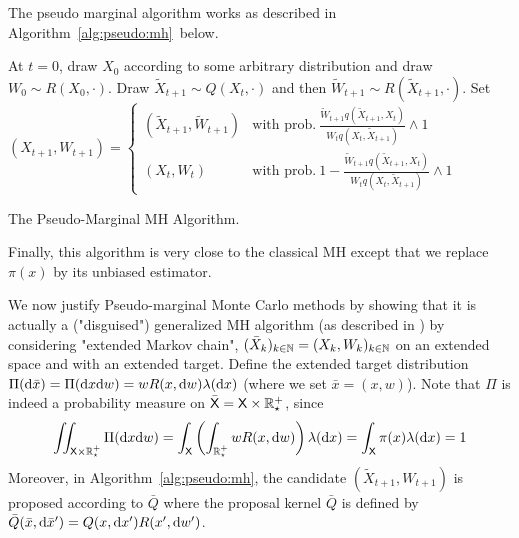 \documentclass[english,graybox,envcountchap,envcountsame,sectrefs,shortlabels]{svmono}
\theoremstyle{style}
\begin{document}
The pseudo marginal algorithm works as described in Algorithm~\ref{alg:pseudo:mh}\ below.
\begin{algorithm}
\centering
\begin{algorithmic}
\State At $t=0$, draw $X_{0}$ according to some arbitrary distribution and draw $W_0\sim R(X_0,\cdot)$.
\State Draw $\tilde X_{t+1}\sim Q(X_{t},\cdot)$ and then $ \tilde W_{t+1}\sim R(\tilde X_{t+1},\cdot)$.
\State Set $(X_{t+1},W_{t+1})=\begin{cases} (\tilde X_{t+1},\tilde W_{t+1}) & \mbox{with prob.}\ \frac{\tilde W_{t+1} q(\tilde X_{t+1},X_t)}{W_t q(X_t,\tilde X_{t+1})}\wedge 1\\ (X_{t},W_t)& \mbox{with prob.}\ 1-\frac{\tilde W_{t+1} q(\tilde X_{t+1},X_t)}{W_t q(X_t,\tilde X_{t+1})}\wedge 1\end{cases}$
\EndFor
\end{algorithmic}
\label{alg:pseudo:mh}
\caption{The Pseudo-Marginal MH Algorithm.}
\end{algorithm}
%
Finally, this algorithm is very close to the classical MH except that we replace $\pi(x)$ by its unbiased estimator.



We now justify Pseudo-marginal Monte Carlo methods by showing that it is actually a ("disguised") generalized MH algorithm (as described in ) by considering "extended Markov chain", $(\bar X_k)_{k\in\mathbb{N}}=(X_k,W_k)_{k\in\mathbb{N}}$ on an extended space and with an extended target. Define the extended target distribution $\Pi(\mathrm{d} \bar x)=\Pi(\mathrm{d} x\mathrm{d} w)=w R(x,\mathrm{d} w) \lambda(\mathrm{d} x)$ (where we set $\bar x=(x,w)$). Note that $\Pi$ is indeed a probability measure on $\bar{\mathsf{X}}=\mathsf{X} \times \mathbb{R}^+_\star$, since
$$
\iint_{\mathsf{X}\times\mathbb{R}^+_\star} \Pi(\mathrm{d} x\mathrm{d} w)=\int_{\mathsf{X}} \left( \int_{\mathbb{R}^+_\star} w R(x,\mathrm{d} w)\right)\lambda(\mathrm{d} x)=\int_{\mathsf{X}} \pi(x)\lambda(\mathrm{d} x)=1
$$
Moreover, in Algorithm~\ref{alg:pseudo:mh}, the candidate $(\tilde X_{t+1},W_{t+1})$ is proposed according to $\bar Q$ where the proposal kernel $\bar Q$ is defined by $\bar Q( \bar x,\mathrm{d} \bar x')=Q(x,\mathrm{d} x') R(x',\mathrm{d} w')$.
\end{document}
